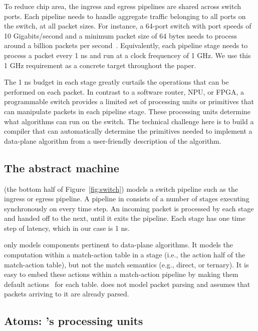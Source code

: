 To reduce chip area, the ingress and egress pipelines are shared across switch
ports.  Each pipeline needs to handle aggregate traffic belonging to all ports
on the switch, at all packet sizes. For instance, a 64-port switch with port
speeds of 10 Gigabits/second and a minimum packet size of 64 bytes needs to
process around a billion packets per second~\cite{rmt}.  Equivalently, each
pipeline stage needs to process a packet every 1 ns and run at a clock
frequencey of 1 GHz. We use this 1 GHz requirement as a concrete target
throughout the paper.

The 1 ns budget in each stage greatly curtails the operations that can be
performed on each packet. In contrast to a software router, NPU, or FPGA, a
programmable switch provides a limited set of processing units or primitives
that can manipulate packets in each pipeline stage. These processing units
determine what algorithms can run on the switch. The technical challenge here
is to build a compiler that can automatically determine the primitives needed
to implement a data-plane algorithm from a user-friendly description of the
algorithm.

\subsection{The \absmachine abstract machine}

\absmachine (the bottom half of Figure~\ref{fig:switch}) models a switch
pipeline such as the ingress or egress pipeline. A pipeline in \absmachine
consists of a number of stages executing synchronously on every time step. An
incoming packet is processed by each stage and handed off to the next, until it
exits the pipeline. Each stage has one time step of latency, which in our case
is 1 ns.

\absmachine only models components pertinent to data-plane algorithms. It
models the computation within a match-action table in a stage (i.e., the action
half of the match-action table), but not the match semantics (e.g., direct, or
ternary). It is easy to embed these actions within a match-action pipeline by
making them default actions~\cite{p4spec} for each table. \absmachine does not
model packet parsing and assumes that packets arriving to it are already
parsed.

\subsection{Atoms: \absmachine's processing units}


